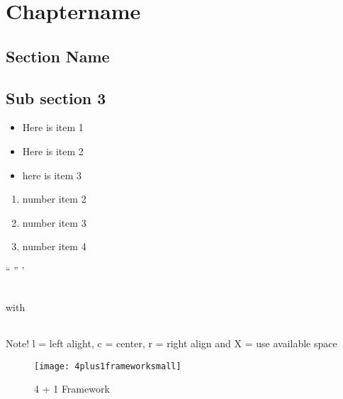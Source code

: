 \chapter{Chaptername}

\section{Section Name}

\section{Sub section 3}


\begin{itemize}
\item Here is item 1
\item Here is item 2
\item here is item 3
\end{itemize}


\begin{enumerate}
\item number item 2
\item number item 3
\item number item 4
\end{enumerate}



“   ” ’




\begin{tabular}{lll}

\end{tabular}

with

\begin{tabularx}{\textwidth}{l X l} %


\end{tabularx}

Note! l = left alight, c = center, r = right align and X = use available space



\begin{figure}
\centering
\texttt{[image: 4plus1frameworksmall]}
\caption{4 + 1 Framework}
\label{fig:4plus1frameworksmall}
\end{figure}